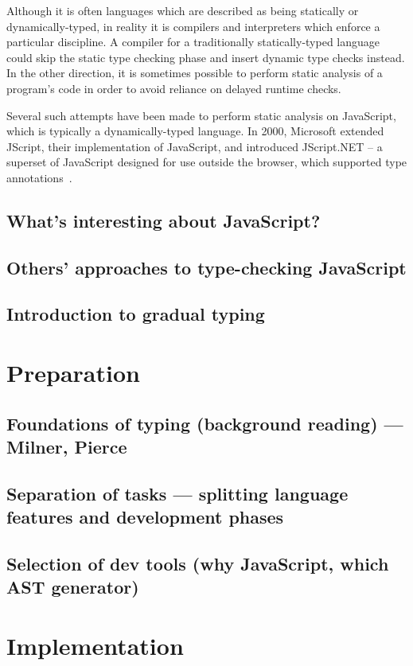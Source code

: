 \documentclass[12pt,a4paper,twoside,openright]{report}
\begin{document}
Although it is often languages which are described as being statically or
dynamically-typed, in reality it is compilers and interpreters which enforce a
particular discipline. A compiler for a traditionally statically-typed language
could skip the static type checking phase and insert dynamic type checks
instead. In the other direction, it is sometimes possible to perform static
analysis of a program's code in order to avoid reliance on delayed runtime
checks.

Several such attempts have been made to perform static analysis on JavaScript,
which is typically a dynamically-typed language. In 2000, Microsoft extended
JScript, their implementation of JavaScript, and introduced JScript.NET -- a
superset of JavaScript designed for use outside the browser, which supported
type annotations~\cite{jscript}.
\printbibliography
\section{What's interesting about JavaScript?}
\section{Others' approaches to type-checking JavaScript}
\section{Introduction to gradual typing}

\chapter{Preparation}\label{preparation}
\section{Foundations of typing (background reading) --- Milner, Pierce}
\section{Separation of tasks --- splitting language features and development phases}
\section{Selection of dev tools (why JavaScript, which AST generator)}
\chapter{Implementation}\label{implementation}
\end{document}
